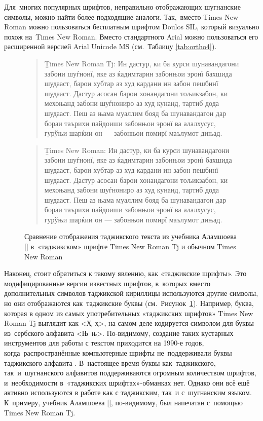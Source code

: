 Для~многих популярных шрифтов, неправильно отображающих шугнанские символы, можно найти более подходящие аналоги. Так,~вместо Times New Roman можно пользоваться бесплатным шрифтом Doulos SIL, который визуально похож на~Times New Roman. Вместо стандартного Arial можно пользоваться его расширенной версией Arial Unicode MS (см.~Таблицу \ref{tab:ortho4}).

\begin{figure}[ht]
 \centering 
 \caption{Сравнение отображения таджикского текста из учебника Аламшоева [\cite*[4]{alamshoev2014}] в~«таджикском» шрифте Times New Roman Tj и обычном Times New Roman}
 \smallskip
 \label{fig:ortho5}

 \begin{quote} \begin{spacing}{1.2}
 \b{Times New Roman Tj}: {Ин дастур, ки ба курси шунавандагони забони шуѓнонї, яке аз ќадимтарин забонњои эронї бахшида шудааст, барои хубтар аз худ кардани ин забон пешбинї шудааст. Дастур асосан барои хонандагони тољикзабон, ки мехоњанд забони шуѓнониро аз худ кунанд, тартиб дода шудааст. Пеш аз њама муаллим бояд ба шунавандагон дар бораи  таърихи пайдоиши забонњои эронї ва алалхусус, гурўњи шарќии он — забонњои помирї маълумот дињад.}
 \end{spacing} \end{quote}

 \begin{quote} \begin{spacing}{1.2}
 \b{Times New Roman}: {Ин дастур, ки ба курси шунавандагони забони шуѓнонї, яке аз ќадимтарин забонњои эронї бахшида шудааст, барои хубтар аз худ кардани ин забон пешбинї шудааст. Дастур асосан барои хонандагони тољикзабон, ки мехоњанд забони шуѓнониро аз худ кунанд, тартиб дода шудааст. Пеш аз њама муаллим бояд ба шунавандагон дар бораи  таърихи пайдоиши забонњои эронї ва алалхусус, гурўњи шарќии он — забонњои помирї маълумот дињад.}
 \end{spacing} \end{quote}
\end{figure}

\pagebreak[3]

Наконец, стоит обратиться к такому явлению, как «таджикские шрифты». Это модифицированные версии известных шрифтов, в~которых вместо дополнительных символов таджикской кириллицы используются другие символы, но они отображаются как~таджикские буквы (см.~Рисунок~\ref{fig:ortho5}). Например, буква, которая в одном из самых употребительных «таджикских шрифтов» Times New Roman Tj выглядит как <Ҳ~ҳ>, на самом деле кодируется символом для буквы из~сербского алфавита <Њ~њ>. По-видимому, создание таких кустарных инструментов для работы с текстом приходится на 1990-е годов, когда~распространённые компьютерные шрифты не~поддерживали буквы таджикского алфавита \parencite{graschenko2011}. В~настоящее время буквы как~таджикского, так~и~шугнанского алфавитов поддерживаются огромным количеством шрифтов, и~необходимости в~«таджикских шрифтах»-обманках нет. Однако они всё ещё активно используются в работе как с таджикским, так~и с~шугнанским языком. К~примеру, учебник Аламшоева [\cite*{alamshoev2014}], по-видимому, был напечатан с~помощью Times New Roman Tj.

